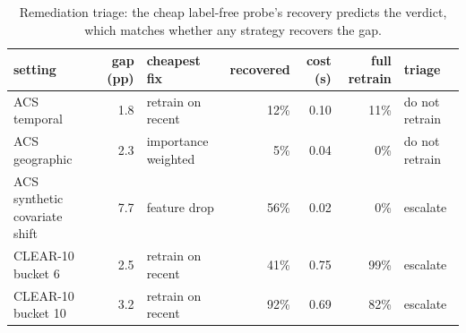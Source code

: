 \begin{table}[!htbp]
\centering
\caption{Remediation triage: the cheap label-free probe's recovery predicts the verdict, which matches whether any strategy recovers the gap.}
\label{tab:triage}
\renewcommand{\arraystretch}{1.2}\setlength{\tabcolsep}{3pt}\scriptsize
\begin{tabular}{@{}l r l r r r l@{}}
\toprule
setting & gap (pp) & cheapest fix & recovered & cost (s) & full retrain & triage \\
\midrule
ACS temporal & 1.8 & retrain on recent & 12\% & 0.10 & 11\% & do not retrain \\
ACS geographic & 2.3 & importance weighted & 5\% & 0.04 & 0\% & do not retrain \\
ACS synthetic covariate shift & 7.7 & feature drop & 56\% & 0.02 & 0\% & escalate \\
CLEAR-10 bucket 6 & 2.5 & retrain on recent & 41\% & 0.75 & 99\% & escalate \\
CLEAR-10 bucket 10 & 3.2 & retrain on recent & 92\% & 0.69 & 82\% & escalate \\
\bottomrule
\end{tabular}
\end{table}
